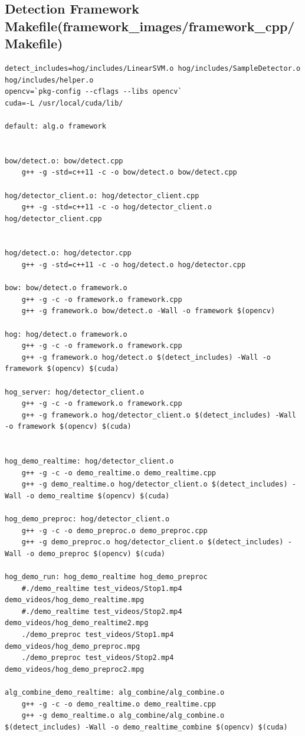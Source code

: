 \documentclass[letterpaper,10pt,titlepage]{article}
\begin{document}
\subsection*{Detection Framework Makefile(framework\_images/framework\_cpp/Makefile)}
\begin{lstlisting}
detect_includes=hog/includes/LinearSVM.o hog/includes/SampleDetector.o hog/includes/helper.o 
opencv=`pkg-config --cflags --libs opencv`
cuda=-L /usr/local/cuda/lib/

default: alg.o framework


bow/detect.o: bow/detect.cpp
	g++ -g -std=c++11 -c -o bow/detect.o bow/detect.cpp

hog/detector_client.o: hog/detector_client.cpp
	g++ -g -std=c++11 -c -o hog/detector_client.o hog/detector_client.cpp


hog/detect.o: hog/detector.cpp
	g++ -g -std=c++11 -c -o hog/detect.o hog/detector.cpp

bow: bow/detect.o framework.o
	g++ -g -c -o framework.o framework.cpp 
	g++ -g framework.o bow/detect.o -Wall -o framework $(opencv)

hog: hog/detect.o framework.o
	g++ -g -c -o framework.o framework.cpp 
	g++ -g framework.o hog/detect.o $(detect_includes) -Wall -o framework $(opencv) $(cuda)

hog_server: hog/detector_client.o
	g++ -g -c -o framework.o framework.cpp
	g++ -g framework.o hog/detector_client.o $(detect_includes) -Wall -o framework $(opencv) $(cuda)


hog_demo_realtime: hog/detector_client.o
	g++ -g -c -o demo_realtime.o demo_realtime.cpp
	g++ -g demo_realtime.o hog/detector_client.o $(detect_includes) -Wall -o demo_realtime $(opencv) $(cuda)

hog_demo_preproc: hog/detector_client.o
	g++ -g -c -o demo_preproc.o demo_preproc.cpp
	g++ -g demo_preproc.o hog/detector_client.o $(detect_includes) -Wall -o demo_preproc $(opencv) $(cuda)

hog_demo_run: hog_demo_realtime hog_demo_preproc 
	#./demo_realtime test_videos/Stop1.mp4 demo_videos/hog_demo_realtime.mpg 
	#./demo_realtime test_videos/Stop2.mp4 demo_videos/hog_demo_realtime2.mpg 
	./demo_preproc test_videos/Stop1.mp4 demo_videos/hog_demo_preproc.mpg 
	./demo_preproc test_videos/Stop2.mp4 demo_videos/hog_demo_preproc2.mpg 

alg_combine_demo_realtime: alg_combine/alg_combine.o
	g++ -g -c -o demo_realtime.o demo_realtime.cpp
	g++ -g demo_realtime.o alg_combine/alg_combine.o $(detect_includes) -Wall -o demo_realtime_combine $(opencv) $(cuda)


\end{lstlisting}
\end{document}
